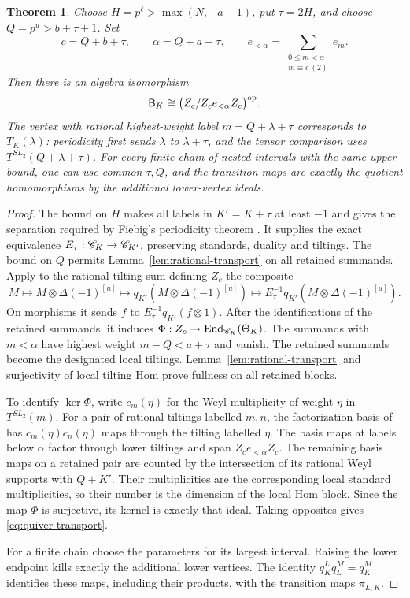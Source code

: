 \documentclass[11pt,reqno]{amsart}
\newtheorem{theorem}{Theorem}[section]
\theoremstyle{definition}
\theoremstyle{remark}
\numberwithin{equation}{section}
\begin{document}
\begin{theorem}\label{thm:quiver-transport}
Choose $H=p^\ell>\max(N,-a-1)$, put $\tau=2H$, and choose
$Q=p^u>b+\tau+1$. Set
\[
 c=Q+b+\tau,\qquad \alpha=Q+a+\tau,\qquad
 e_{<\alpha}=\sum_{\substack{0\leq m<\alpha\\m\equiv c\ (2)}}e_m.
\]
Then there is an algebra isomorphism
\begin{equation}\label{eq:quiver-transport}
 \mathsf B_K\cong\bigl(Z_c/Z_ce_{<\alpha}Z_c\bigr)^{\mathrm{op}}.
\end{equation}
The vertex with rational highest-weight label $m=Q+\lambda+\tau$
corresponds to $T_K(\lambda)$: periodicity first sends $\lambda$ to
$\lambda+\tau$, and the tensor comparison uses
$T^{SL_2}(Q+\lambda+\tau)$.
For every finite chain of nested intervals with the same upper bound,
one can use common $\tau,Q$, and the transition maps are exactly the
quotient homomorphisms by the additional lower-vertex ideals.
\end{theorem}
\begin{proof}
The bound on $H$ makes all labels in $K'=K+\tau$ at least $-1$
and gives the separation required by Fiebig's periodicity
theorem \cite[Theorem~25, p.~1099]{Fiebig}. It supplies the exact equivalence
$E_\tau:\mathscr C_K\to\mathscr C_{K'}$, preserving standards, duality and tiltings.
The bound on $Q$ permits Lemma~\ref{lem:rational-transport} on
all retained summands. Apply to the rational tilting sum defining $Z_c$
the composite
\[
 M\longmapsto M\otimes\Delta(-1)^{[u]}
       \longmapsto q_{K'}(M\otimes\Delta(-1)^{[u]})
       \longmapsto E_\tau^{-1}q_{K'}(M\otimes\Delta(-1)^{[u]}).
\]
On morphisms it sends $f$ to
$E_\tau^{-1}q_{K'}(f\otimes1)$. After the identifications of
the retained summands, it induces
$\Phi:Z_c\to\operatorname{End}_{\mathscr C_K}(\Theta_K)$.
The summands with $m<\alpha$ have highest weight
$m-Q<a+\tau$ and vanish. The retained summands become the designated
local tiltings. Lemma~\ref{lem:rational-transport} and surjectivity of
local tilting Hom prove fullness on all retained blocks.

To identify $\ker\Phi$, write $c_m(\eta)$ for the Weyl multiplicity
of weight $\eta$ in $T^{SL_2}(m)$. For a pair of rational tiltings
labelled $m,n$, the factorization basis of
\cite[Corollary~4.44]{BS} has $c_m(\eta)c_n(\eta)$ maps through
the tilting labelled $\eta$. The basis maps at labels below $\alpha$
factor through lower tiltings and span $Z_ce_{<\alpha}Z_c$.
The remaining basis maps on a retained pair are counted by the
intersection of its rational Weyl supports with $Q+K'$.
Their multiplicities are the corresponding local standard multiplicities, so
their number is the dimension of the local Hom block. Since the
map $\Phi$ is surjective, its kernel is exactly that ideal.
Taking opposites gives \eqref{eq:quiver-transport}.

For a finite chain choose the parameters for its largest interval.
Raising the lower endpoint kills exactly the additional lower
vertices. The identity $q_K^Lq_L^M=q_K^M$ identifies
these maps, including their products, with the transition maps
$\pi_{L,K}$.
\end{proof}
\end{document}
